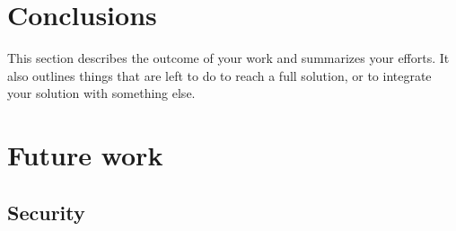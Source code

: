 \section{Conclusions}
This section describes the outcome of your work and summarizes your efforts. It also outlines things that are left to do to reach a full solution, or to integrate your solution with something else.
\section{Future work}
\subsection{Security}